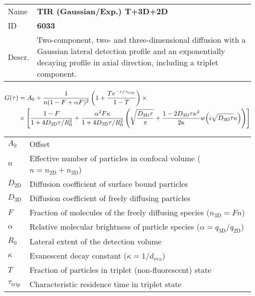 \noindent \begin{tabular}{lp{}}
Name & \textbf{TIR (Gaussian/Exp.) T+3D+2D} \\ 
ID & \textbf{6033} \\ 
Descr. &  Two-component, two- and three-dimensional diffusion with a Gaussian lateral detection profile and an exponentially decaying profile in axial direction, including a triplet component\cite{Starr2001, Hassler2005, Ohsugi2006}. \\ 
\end{tabular}
\begin{align}
G(\tau) &= A_0 + \frac{1}{n (1-F + \alpha F)^2} \left(1 + \frac{T e^{-\tau/\tau_\mathrm{trip}}}{1-T}  \right)  \times \\
& \notag \times  \left[
\frac{1-F}{1+ 4 D_\mathrm{2D} \tau/R_0^2} + 
\frac{\alpha^2 F \kappa}{1+ 4 D_\mathrm{3D} \tau/R_0^2} 
\left( \sqrt{\frac{D_\mathrm{3D} \tau}{\pi}} + \frac{1 - 2 D_\mathrm{3D} \tau \kappa^2}{2 \kappa}  w\!\left(i \sqrt{D_\mathrm{3D} \tau} \kappa\right) \right) \right]
\end{align} 
\begin{center}
\begin{tabular}{ll}
$A_0$ & Offset \\ 
$n$ & Effective number of particles in confocal volume ($n = n_\mathrm{2D}+n_\mathrm{3D}$) \\ 
$D_\mathrm{2D}$ &  Diffusion coefficient of surface bound particles \\ 
$D_\mathrm{3D}$ &  Diffusion coefficient of freely diffusing particles \\ 
$F$ & Fraction of molecules of the freely diffusing species ($n_\mathrm{3D} = F n$) \\
$\alpha$ & Relative molecular brightness of particle species ($ \alpha = q_\mathrm{3D}/q_\mathrm{2D}$) \\
$R_0$ & Lateral extent of the detection volume \\
$\kappa$ &  Evanescent decay constant ($\kappa = 1/d_\mathrm{eva}$)\\ 
$T$ &  Fraction of particles in triplet (non-fluorescent) state\\ 
$\tau_\mathrm{trip}$ &  Characteristic residence time in triplet state \\ 
\end{tabular}
\end{center}
\vspace{2em}




